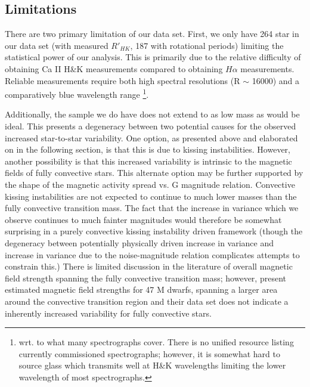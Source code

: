 \subsection{Limitations}
There are two primary limitation of our data set. First, we only have 264 star
in our data set (with measured $R'_{HK}$, 187 with rotational periods) limiting
the statistical power of our analysis. This is primarily due to the relative
difficulty of obtaining Ca II H\&K measurements compared to obtaining $H\alpha$
measurements. Reliable measurements require both high spectral resolutions (R
$\sim$ 16000) and a comparatively blue wavelength range \footnote{wrt. to what
many spectrographs cover. There is no unified resource listing currently
commissioned spectrographs; however, it is somewhat hard to source glass which
transmits well at H\&K wavelengths limiting the lower wavelength of most
spectrographs.}.

Additionally, the sample we do have does not extend to as low mass as would be
ideal. This presents a degeneracy between two potential causes for the observed
increased star-to-star variability. One option, as presented above and
elaborated on in the following section, is that this is due to kissing
instabilities. However, another possibility is that this increased variability
is intrinsic to the magnetic fields of fully convective stars. This alternate
option may be further supported by the shape of the magnetic activity spread vs.
G magnitude relation. Convective kissing instabilities are not expected to
continue to much lower masses than the fully convective transition mass. The
fact that the increase in variance which we observe continues to much fainter
magnitudes would therefore be somewhat surprising in a purely convective kissing
instability driven framework (though the degeneracy between potentially
physically driven increase in variance and increase in variance due to the
noise-magnitude relation complicates attempts to constrain this.) There is
limited discussion in the literature of overall magnetic field strength
spanning the fully convective transition mass; however, \citet{Shulyak2019}
present estimated magnetic field strengths for 47 M dwarfs, spanning a larger
area around the convective transition region and their data set does not
indicate a inherently increased variability for fully convective stars.
